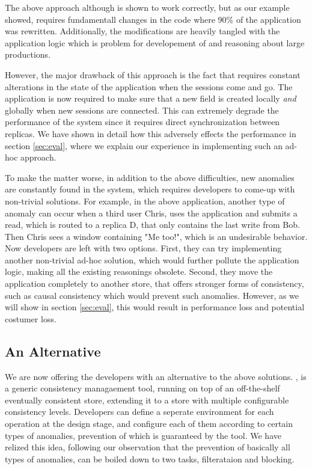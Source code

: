 The above approach although is shown to work correctly, but as our
example showed, requires fundamentall changes in the code where 90\% of
the application was rewritten. Additionally, the modifications are
heavily tangled with the application logic which is problem for
developement of and reasoning about large
productions.

However, the major drawback of this approach is the fact that requires
constant alterations in the state of the application when the sessions
come and go. The application is now required to make
sure that a new field is created locally \emph{and} globally when 
new sessions are connected. This can extremely degrade the performance
of the system since it requires direct synchronization between replicas.
We have shown in detail how this adversely effects the performance in section
\ref{sec:eval}, where  we explain our experience in implementing
such an ad-hoc approach.

To make the matter worse, in addition to the above difficulties,
new anomalies are constantly found in the system, which requires
developers to come-up with non-trivial solutions. For example, in the
above application, another type of anomaly can occur when a third user
Chris, uses the application and submits a read, which is routed to a
replica D, that only contains the last write from Bob. Then Chris sees a
window containing "Me too!", which is an undesirable behavior. Now
developers are left with two options. First, they can try implementing
another non-trivial ad-hoc solution, which would further pollute the
application logic, making all the existing reasonings obsolete. Second,
they move the application completely to another store, that offers
stronger forms of consistency, such as causal consistency which would
prevent such anomalies. However, as we will show in section
\ref{sec:eval}, this would result in performance loss and potential
costumer loss.

%
%
\subsection{An Alternative}
We are now offering the developers with an alternative to the above
solutions. 
\tool, is a generic consistency managaement tool, running on
top of an off-the-shelf eventually consistent store, extending it to
a store with multiple configurable consistency levels. 
Developers can define a seperate environment for each operation at the
design stage, and configure each of them according to certain types of
anomalies, prevention of which is guaranteed by the tool. We have
relized this idea, following our observation that the prevention of basically all
types of anomalies, can be boiled down to two tasks,
filterataion and blocking. 


